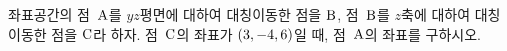 좌표공간의 점~$\mathrm{A}$를 $yz$평면에 대하여 대칭이동한 점을 $\mathrm{B}$, 점~$\mathrm{B}$를 $z$축에 대하여 대칭이동한 점을 $\mathrm{C}$라 하자. 점~$\mathrm{C}$의 좌표가 $(3{,}\mkern3mu\mathopen{}-4{,}\mkern3mu\mathopen{}6)$일 때, 점~$\mathrm{A}$의 좌표를 구하시오.
